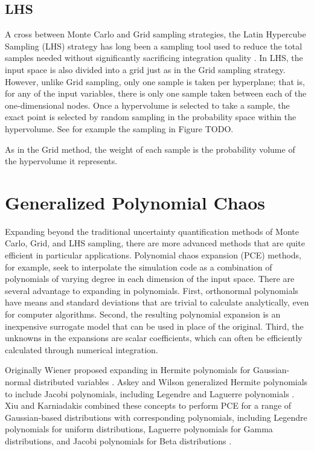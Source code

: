 \subsection{LHS}
A cross between Monte Carlo and Grid sampling strategies, the Latin Hypercube Sampling (LHS) strategy 
has long been a sampling tool used to reduce
the total samples needed without significantly sacrificing integration quality \cite{lhs}.  In LHS, the input
space is also divided into a grid just as in the Grid sampling strategy.  However, unlike Grid sampling, only
one sample is taken per hyperplane; that is, for any of the input variables, there is only one sample taken
between each of the one-dimensional nodes.  Once a hypervolume is selected to take a sample, the exact
point is selected by random sampling in the probability space within the hypervolume.  See for example the
sampling in Figure TODO.

As in the Grid method, the weight of each sample is the probability volume of the hypervolume it represents.

\section{Generalized Polynomial Chaos}
Expanding beyond the traditional uncertainty quantification methods of Monte Carlo, Grid, and LHS sampling, there are more
advanced methods that are quite efficient in particular applications.
Polynomial chaos expansion (PCE) methods, for example, seek to interpolate the simulation code as a combination of
polynomials of varying degree in each dimension of the input space.  There are several advantage to expanding
in polynomials.  First, orthonormal polynomials have means and standard deviations that are trivial to calculate
analytically, even for computer algorithms.  Second, the resulting polynomial expansion is an
inexpensive surrogate model that can be used in place of the original.  Third, the unknowns in the expansions
are scalar coefficients, which can often be efficiently calculated through numerical integration.

Originally Wiener
proposed expanding in Hermite polynomials for Gaussian-normal distributed variables \cite{wiener}.  Askey and
Wilson generalized Hermite polynomials to include Jacobi polynomials, including Legendre and Laguerre
polynomials \cite{Wiener-Askey}.  Xiu and Karniadakis combined these concepts to perform PCE for a range of Gaussian-based
distributions with corresponding polynomials,
including Legendre polynomials for uniform distributions, Laguerre polynomials for Gamma distributions, and
Jacobi polynomials for Beta distributions \cite{xiu}.

